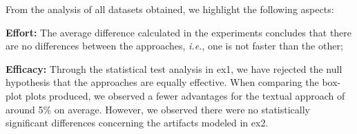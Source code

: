 From the analysis of all datasets obtained, we highlight the following aspects:
\begin{description}
    \item \textbf{Effort:} The average difference calculated in the experiments concludes that there are no differences between the approaches, \textit{i.e.}, one is not faster than the other;
    
    \item \textbf{Efficacy:} Through the statistical test analysis in \ac{ex1}, we have rejected the null hypothesis that the approaches are equally effective.
    When comparing the box-plot plots produced, we observed a fewer advantages for the textual approach of around 5\% on average.
    However, we observed there were no statistically significant differences concerning the artifacts modeled in \ac{ex2}.

\end{description}
